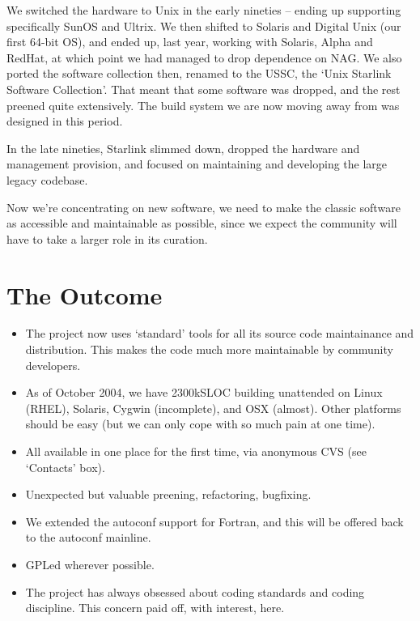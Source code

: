 \documentclass[11pt,twoside]{article}
\begin{document}
We switched the hardware to Unix in the early nineties -- ending up
supporting specifically SunOS and Ultrix.  We then shifted to Solaris
and Digital Unix (our first 64-bit OS), and ended up, last year,
working with Solaris, Alpha and RedHat, at which point we had managed
to drop dependence on NAG.  We also ported the software
collection then, renamed to the USSC, the `Unix Starlink Software
Collection'.  That meant that some software was dropped, and the rest
preened quite extensively.  The build system we are now moving away
from was designed in this period.

In the late nineties, Starlink slimmed down, dropped the hardware and
management provision, and focused on maintaining and developing the
large legacy codebase.

Now we're concentrating on new software, we need to make the classic
software as accessible and maintainable as possible, since we expect
the community will have to take a larger role in its curation.


\section{The Outcome}


\begin{itemize}
\item The project now uses `standard' tools for all its source code
  maintainance and distribution.  This makes the code much more
  maintainable by community developers.

\item As of October 2004, we have 2300kSLOC building unattended on
  Linux (RHEL), Solaris, Cygwin (incomplete), and OSX (almost).  Other
  platforms should be easy (but we can only cope with so much pain at
  one time).

\item All available in one place for the first time, via anonymous CVS
  (see `Contacts' box).

\item Unexpected but valuable preening, refactoring, bugfixing.

\item We extended the autoconf support for Fortran, and this will be
  offered back to the autoconf mainline.

\item GPLed wherever possible.

\item The project has always obsessed about coding standards and
  coding discipline.  This concern paid off, with interest, here.

\end{itemize}  
\end{document}
